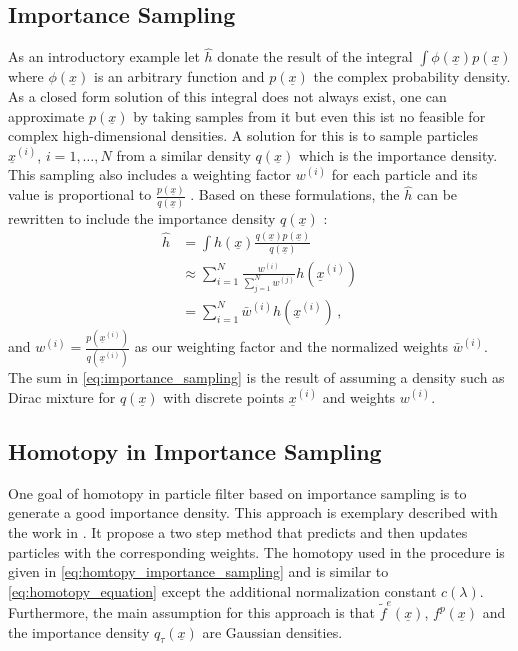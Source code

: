 \documentclass[a4paper]{IEEEtran}
\begin{document}
\subsection{Importance Sampling}
\label{ch:importance_sampling}
As an introductory example let $\hat{h}$ donate the result of the integral $\int \phi(\underline{x})p(\underline{x})$ where $\phi(\underline{x})$ is an arbitrary function and $p(\underline{x})$ the complex probability density. As a closed form solution of this integral does not always exist, one can approximate $p(\underline{x})$
by taking samples from it but even this ist no feasible for complex high-dimensional densities. A solution for this is to sample particles $\underline{x}^{(i)}$, $i = 1, \dotsc, N$ from a similar density $q(\underline{x})$ which is the importance density. This sampling also includes a weighting factor $w^{(i)}$ for each particle and its value 
is proportional to $\frac{p(\underline{x})}{q(\underline{x})}$ \cite{arulampalam2002}. Based on these formulations, the $\hat{h}$ can be rewritten to include the importance density $q(\underline{x})$ \cite{cappe2007b}:
\begin{equation}
    \begin{split}
        \hat{h} &= \int h(\underline{x})\frac{q(\underline{x})p(\underline{x})}{q(\underline{x})} \\
                &\approx \sum_{i=1}^{N} \frac{w^{(i)}}{\sum_{j=1}^{N} w^{(j)}}h(\underline{x}^{(i)}) \\
                &= \sum_{i=1}^{N} \bar{w}^{(i)} h(\underline{x}^{(i)})\,,
    \end{split}
    \label{eq:importance_sampling}
\end{equation}
and $w^{(i)}=\frac{p(\underline{x}^{(i)})}{q(\underline{x}^{(i)})}$ as our weighting factor and the normalized weights $\bar{w}^{(i)}$. The sum in \eqref{eq:importance_sampling} is the result of assuming a density such as Dirac mixture for $q(\underline{x})$ with discrete points $\underline{x}^{(i)}$ and weights $w^{(i)}$.

\subsection{Homotopy in Importance Sampling}
\label{ch:homotopy_importance_sampling}
One goal of homotopy in particle filter based on importance sampling is to generate a good importance density. This approach is exemplary described with the work in \cite{chlebek2016a}. It
propose a two step method that predicts and then updates particles with the corresponding weights. The homotopy used in the procedure is given in \eqref{eq:homtopy_importance_sampling} and is similar to \eqref{eq:homotopy_equation} except the additional normalization constant $c(\lambda)$.
Furthermore, the main assumption for this approach is that $\tilde{f}^{e}(\underline{x})$, $f^{p}(\underline{x})$ and the importance density $q_{\tau}(\underline{x})$ are Gaussian densities.
\end{document}
